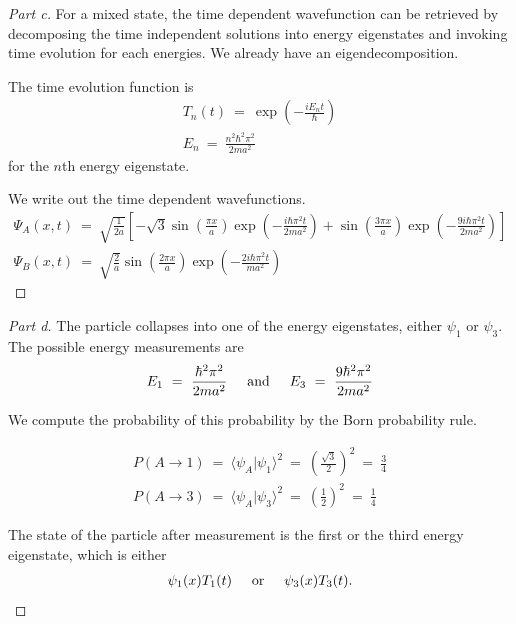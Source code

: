 \documentclass{article}
\numberwithin{equation}{section}
\def\<{{\langle}}
\def\>{{\rangle}}
\newcommand{\textOr}{
    {
        \hspace{5mm}
        \textrm{or}
        \hspace{5mm}
    }
}
\newcommand{\textAnd}{
    {
        \hspace{5mm}
        \textrm{and}
        \hspace{5mm}
    }
}
\begin{document}
\begin{proof}
    [Part c] 
    For a mixed state, the time dependent wavefunction can 
    be retrieved by decomposing the time independent solutions 
    into energy eigenstates and invoking time evolution for 
    each energies. We already have an eigendecomposition. 

    The time evolution function is 
    \begin{align}
        T_n(t) \ = \ \exp\left(-\frac{iE_n t} \hbar\right) \\ 
        E_n \ = \ \frac{n^2 \hbar^2 \pi^2}{2 m a^2}
    \end{align}
    for the $n$th energy eigenstate. 

    We write out the time dependent wavefunctions. 
    \begin{align}
        \Psi_A(x, t) \ = \ 
        \sqrt{\frac 1 {2a}} \left[-\sqrt{3}\sin\left(\frac{\pi x} a \right) 
        \exp\left(-\frac{ i \hbar \pi^2 t}{2 m a^2}\right) 
        + \sin\left(\frac{3 \pi x} a \right) 
        \exp\left(-\frac{ 9 i \hbar \pi^2 t}{2 m a^2}\right) 
        \right] \\ 
        \Psi_B(x, t) \ = \ 
        \sqrt{\frac 2 a} \sin\left(\frac{2\pi x} a \right) 
        \exp\left(-\frac{2 i \hbar \pi^2 t}{m a^2}\right) 
    \end{align}
\end{proof}

\begin{proof}
    [Part d]
    The particle collapses into one of the energy eigenstates, 
    either $\psi_1$ or $\psi_3$. The possible energy measurements are 
    \begin{align}
        E_1 \ = \ \frac{\hbar^2 \pi^2}{2 m a^2} \textAnd 
        E_3 \ = \ \frac{9 \hbar^2 \pi^2}{2 m a^2}
    \end{align}

    We compute the probability of this 
    probability by the Born probability rule. 

    \begin{align}
        P(A\rightarrow 1) \ = \ \<\psi_A|\psi_1\>^2 \ = \ \left(\frac {\sqrt 3} 2\right)^2 \ = \ \frac 3 4
        \\
        P(A \rightarrow 3) \ = \ \<\psi_A|\psi_3\>^2 \ = \ \left(\frac 1 2\right)^2 \ = \ \frac 1 4
    \end{align}

    The state of the particle after measurement is the 
    first or the third energy eigenstate, which is either 
    \begin{align}
        \psi_1(x) T_1(t) \textOr \psi_3(x) T_3(t).
    \end{align}
\end{proof}
\end{document}
